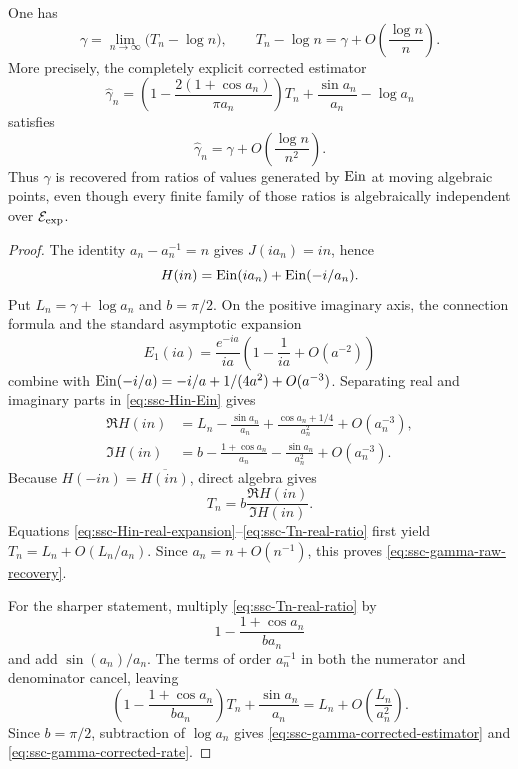 \begin{theorem}
\label{thm:ssc-gamma-scattering}
One has
\begin{equation}\label{eq:ssc-gamma-raw-recovery}
 \gamma=\lim_{n\to\infty}\bigl(T_n-\log n\bigr),
 \qquad
 T_n-\log n
 =\gamma+O\!\left(\frac{\log n}{n}\right).
\end{equation}
More precisely, the completely explicit corrected estimator
\begin{equation}\label{eq:ssc-gamma-corrected-estimator}
 \widehat\gamma_n=
 \left(1-\frac{2(1+\cos a_n)}{\pi a_n}\right)T_n
 +\frac{\sin a_n}{a_n}-\log a_n
\end{equation}
satisfies
\begin{equation}\label{eq:ssc-gamma-corrected-rate}
 \widehat\gamma_n
 =\gamma+O\!\left(\frac{\log n}{n^2}\right).
\end{equation}
Thus \(\gamma\) is recovered from ratios of values generated by
\(\operatorname{Ein}\) at moving algebraic points, even though every finite family of
those ratios is algebraically independent over \(\mathcal E_{\mathrm{exp}}\).
\end{theorem}

\begin{proof}
The identity \(a_n-a_n^{-1}=n\) gives \(J(ia_n)=in\), hence
\begin{equation}\label{eq:ssc-Hin-Ein}
 H(in)=\operatorname{Ein}(ia_n)+\operatorname{Ein}(-i/a_n).
\end{equation}
Put \(L_n=\gamma+\log a_n\) and \(b=\pi/2\).  On the positive imaginary
axis, the connection formula and the standard asymptotic expansion
\[
 E_1(ia)=\frac{e^{-ia}}{ia}
 \left(1-\frac1{ia}+O(a^{-2})\right)
\]
combine with
\(\operatorname{Ein}(-i/a)=-i/a+1/(4a^2)+O(a^{-3})\).  Separating real and imaginary
parts in \eqref{eq:ssc-Hin-Ein} gives
\begin{align}
 \Re H(in)
 &=L_n-\frac{\sin a_n}{a_n}
   +\frac{\cos a_n+1/4}{a_n^2}+O(a_n^{-3}),
   \label{eq:ssc-Hin-real-expansion}\\
 \Im H(in)
 &=b-\frac{1+\cos a_n}{a_n}
   -\frac{\sin a_n}{a_n^2}+O(a_n^{-3}).
   \label{eq:ssc-Hin-imag-expansion}
\end{align}
Because \(H(-in)=\overline{H(in)}\), direct algebra gives
\begin{equation}\label{eq:ssc-Tn-real-ratio}
 T_n=b\frac{\Re H(in)}{\Im H(in)}.
\end{equation}
Equations \eqref{eq:ssc-Hin-real-expansion}--\eqref{eq:ssc-Tn-real-ratio}
first yield
\(T_n=L_n+O(L_n/a_n)\).  Since
\(a_n=n+O(n^{-1})\), this proves
\eqref{eq:ssc-gamma-raw-recovery}.

For the sharper statement, multiply \eqref{eq:ssc-Tn-real-ratio} by
\[
 1-\frac{1+\cos a_n}{b a_n}
\]
and add \(\sin(a_n)/a_n\).  The terms of order \(a_n^{-1}\) in both the
numerator and denominator cancel, leaving
\[
 \left(1-\frac{1+\cos a_n}{b a_n}\right)T_n
 +\frac{\sin a_n}{a_n}
 =L_n+O\!\left(\frac{L_n}{a_n^2}\right).
\]
Since \(b=\pi/2\), subtraction of \(\log a_n\) gives
\eqref{eq:ssc-gamma-corrected-estimator} and
\eqref{eq:ssc-gamma-corrected-rate}.
\end{proof}

